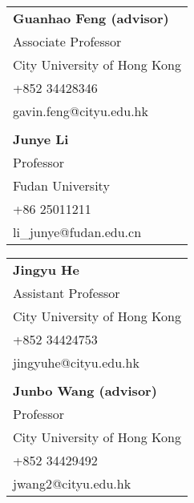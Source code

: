 \documentclass{clean_cv}
\begin{document}
\hspace{3cm} \begin{tabular}{l}
	
	\textbf{Guanhao Feng (advisor)}                            \\
	Associate Professor                                  \\
	City University of Hong Kong                \\
	+852 34428346                                      \\
	gavin.feng@cityu.edu.hk                       \\
	
	\\
	
	\textbf{Junye Li}                                   \\
	Professor                                                \\
	Fudan University                                   \\
	+86 25011211                                        \\
	li\_junye@fudan.edu.cn                        \\
	
\end{tabular} \hspace{3cm} \begin{tabular}{l}
	
	\textbf{Jingyu He}                                   \\
	Assistant Professor                                \\
	City University of Hong Kong              \\
	+852 34424753                                    \\
	jingyuhe@cityu.edu.hk                         \\
	
	\\
	
	\textbf{Junbo Wang (advisor)}                              \\
	Professor                                                 \\
	City University of Hong Kong                \\
	+852 34429492                                      \\
	jwang2@cityu.edu.hk                            \\
	
\end{tabular} 
\end{document}
